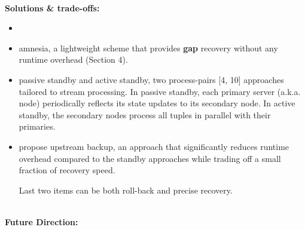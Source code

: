 \noindent \textbf{\\Solutions \& trade-offs:}

\begin{itemize}
	\item {}
	\item amnesia, a lightweight scheme that provides
	\textbf{gap} recovery without any runtime overhead (Section 4).
	\item  passive standby and active standby, two
	process-pairs [4, 10] approaches tailored to stream processing.
	In passive standby, each primary server (a.k.a. node) periodically
	reflects its state updates to its secondary node. In
	active standby, the secondary nodes process all tuples in parallel
	with their primaries. 
	\item  propose upstream backup,
	an approach that significantly reduces runtime overhead compared
	to the standby approaches while trading off a small
	fraction of recovery speed. 
	
	Last two items can be both roll-back and precise recovery.
	
\end{itemize}


\begin{table}[h]
\end{table}


\noindent \textbf{\\Future Direction:}  







